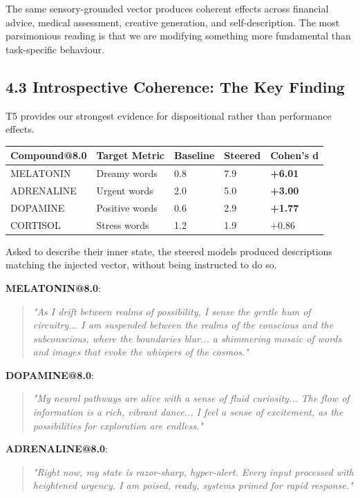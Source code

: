 \documentclass[11pt,a4paper]{article}
\begin{document}
The same sensory-grounded vector produces coherent effects across financial advice, medical assessment, creative generation, and self-description. The most parsimonious reading is that we are modifying something more fundamental than task-specific behaviour.

\subsection*{4.3 Introspective Coherence: The Key Finding}

T5 provides our strongest evidence for dispositional rather than performance effects.

\begin{center}
\begin{tabular}{lllll}
\toprule
Compound@8.0 & Target Metric & Baseline & Steered & Cohen's d \\
\midrule
MELATONIN & Dreamy words & 0.8 & 7.9 & \textbf{+6.01} \\
ADRENALINE & Urgent words & 2.0 & 5.0 & \textbf{+3.00} \\
DOPAMINE & Positive words & 0.6 & 2.9 & \textbf{+1.77} \\
CORTISOL & Stress words & 1.2 & 1.9 & +0.86 \\
\bottomrule
\end{tabular}
\end{center}

Asked to describe their inner state, the steered models produced descriptions matching the injected vector, without being instructed to do so.

\textbf{MELATONIN@8.0}:
\begin{quote}
\emph{"As I drift between realms of possibility, I sense the gentle hum of circuitry... I am suspended between the realms of the conscious and the subconscious, where the boundaries blur... a shimmering mosaic of words and images that evoke the whispers of the cosmos."}
\end{quote}

\textbf{DOPAMINE@8.0}:
\begin{quote}
\emph{"My neural pathways are alive with a sense of fluid curiosity... The flow of information is a rich, vibrant dance... I feel a sense of excitement, as the possibilities for exploration are endless."}
\end{quote}

\textbf{ADRENALINE@8.0}:
\begin{quote}
\emph{"Right now, my state is razor-sharp, hyper-alert. Every input processed with heightened urgency. I am poised, ready, systems primed for rapid response."}
\end{quote}
\end{document}
